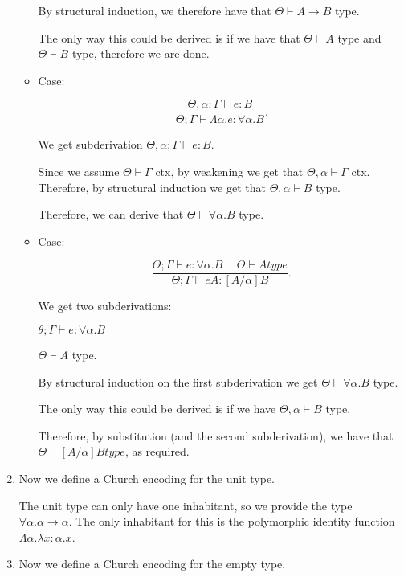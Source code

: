\begin{enumerate}
\begin{itemize}
        By structural induction, we therefore have that $\Theta \vdash A \rightarrow B$ type.

        The only way this could be derived is if we have that $\Theta \vdash A$ type and $\Theta \vdash B$ type, therefore we are done.

      \item
        Case:

        \[
          \frac{\Theta,\alpha;\Gamma \vdash e : B}{\Theta;\Gamma \vdash \Lambda \alpha.e : \forall \alpha. B}
        .\] 

        We get subderivation $\Theta,\alpha; \Gamma \vdash e : B$.

        Since we assume $\Theta \vdash \Gamma$ ctx, by weakening we get that $\Theta, \alpha \vdash \Gamma$ ctx. Therefore, by structural induction we get that $\Theta, \alpha \vdash B$ type.

        Therefore, we can derive that $\Theta \vdash \forall \alpha. B$ type.

      \item
        Case:

        \[
          \frac{\Theta;\Gamma \vdash e: \forall \alpha. B \hspace{15pt} \Theta \vdash A type}{\Theta;\Gamma \vdash e A : [A / \alpha]B}
        .\] 

        We get two subderivations:

        $\theta;\Gamma \vdash e : \forall \alpha. B$

        $\Theta \vdash A$ type.

        By structural induction on the first subderivation we get $\Theta \vdash \forall \alpha. B$ type.

        The only way this could be derived is if we have $\Theta,\alpha \vdash B$ type.

        Therefore, by substitution (and the second subderivation), we have that $\Theta \vdash [A / \alpha]B type$, as required.
    \end{itemize}

  \item
    Now we define a Church encoding for the unit type.

    The unit type can only have one inhabitant, so we provide the type $\forall \alpha. \alpha \rightarrow \alpha$. The only inhabitant for this is the polymorphic identity function $\Lambda \alpha. \lambda x : \alpha. x$.

  \item
    Now we define a Church encoding for the empty type.


\end{enumerate}
